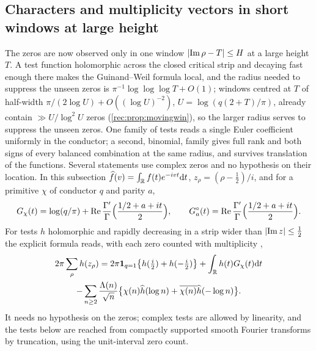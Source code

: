 \subsection{Characters and multiplicity vectors in short windows at large height}\label{rec:sec:localwin}

The zeros are now observed only in one window $\abs{\Im\rho-T}\le H$ at a large height $T$. A test
function holomorphic across the closed critical strip and decaying fast enough there makes the
Guinand--Weil formula local, and the radius needed to suppress the unseen zeros is
$\pi^{-1}\log\log\log T+O(1)$; windows centred at $T$ of half-width $\pi/(2\log U)+O((\log U)^{-2})$, $U=\log(q(2+T)/\pi)$, already
contain $\gg U/\log^2U$ zeros (\cref{rec:prop:movingwin}), so the larger radius serves to suppress the unseen zeros. One family of tests reads a single Euler coefficient uniformly in the
conductor; a second, binomial, family gives full rank and both signs of every balanced
combination at the same radius, and survives translation of the functions. Several statements
use complex zeros and no hypothesis on their location. In this subsection
$\widehat f(v)=\int_\R f(t)e^{-ivt}\dd t$, $z_\rho=(\rho-\tfrac12)/i$, and for a primitive $\chi$ of
conductor $q$ and parity $a$,
\[
 G_\chi(t)=\log(q/\pi)+\Re\frac{\Gamma'}\Gamma\Bigl(\frac{1/2+a+it}2\Bigr),\qquad
 G_a^\circ(t)=\Re\frac{\Gamma'}\Gamma\Bigl(\frac{1/2+a+it}2\Bigr).
\]
For tests $h$ holomorphic and rapidly decreasing in a strip wider than $\abs{\Im z}\le\tfrac12$ the
explicit formula reads, with each zero counted with multiplicity
\cite{ChirrePereiraDeLaat2021Primes,Davenport2000Multiplicative},
\begin{multline}\label{rec:eq:gwstrip}
 2\pi\sum_\rho h(z_\rho)=2\pi\mathbf 1_{q=1}\bigl\{h(\tfrac i2)+h(-\tfrac i2)\bigr\}+\int_\R h(t)G_\chi(t)\dd t\\
 -\sum_{n\ge2}\frac{\Lambda(n)}{\sqrt n}\bigl\{\chi(n)\widehat h(\log n)+\overline{\chi(n)}\widehat h(-\log n)\bigr\}.
\end{multline}
It needs no hypothesis on the zeros; complex tests are allowed by linearity, and the tests below
are reached from compactly supported smooth Fourier transforms by truncation, using the
unit-interval zero count.

